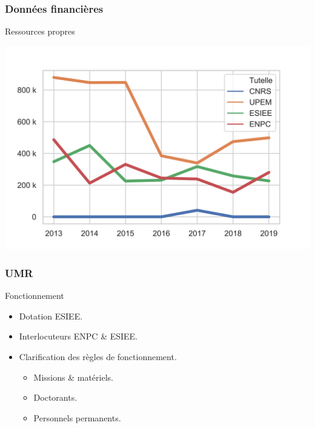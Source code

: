 \documentclass[]{beamer}
\begin{document}

\begin{frame}[fragile]
  \frametitle{Données financières}

  \begin{block}{Ressources propres}
    \begin{center}
      \includegraphics[scale=.7]{pictures/ressources.png}
    \end{center}
  \end{block}

\end{frame}


\begin{frame}
  \frametitle{UMR}

  \begin{block}{Fonctionnement}
    \begin{itemize}
      \item Dotation ESIEE.
      \item Interlocuteurs ENPC \& ESIEE.
      \item Clarification des règles de fonctionnement.
      \begin{itemize}
        \item Missions \& matériels.
        \item Doctorants.
        \item Personnels permanents.
      \end{itemize}
    \end{itemize}
  \end{block}

\end{frame}
\end{document}
